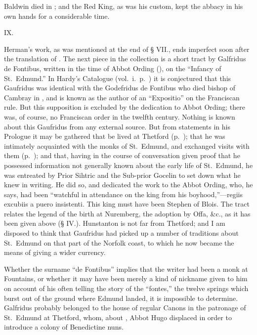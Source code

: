 \documentclass[10pt]{book}
\begin{document}
{Baldwin died in ; and the Red King, as was his custom, kept the abbacy in his own hands for a considerable time.

\vspace{.3cm}
\begin{center}
IX.
\end{center}
\noindent Herman's work, as was mentioned at the end of \S{} VII., ends imperfect soon after the translation of . The next piece in the collection is a short tract by Galfridus de Fontibus, written in the time of Abbot Ording (), on the ``Infancy of St.\ Edmund.'' In Hardy's Catalogue (vol.\ i.\ p.\ ) it is conjectured that this Gaufridus was identical with the Godefridus de Fontibus who died bishop of Cambray in , and is known as the author of an ``Expositio'' on the Franciscan rule. But this supposition is excluded by the dedication to Abbot Ording; there was, of course, no Franciscan order in the twelfth century. Nothing is known about this Gaufridus from any external source. But from statements in his Prologue it may be gathered that be lived at Thetford (p.\ ); that he was intimately acquainted with the monks of St.\ Edmund, and exchanged visits with them (p.\ ); and that, having in the course of conversation given proof that he possessed information not generally known about the early life of St.\ Edmund, he was entreated by Prior Sihtric and the Sub-prior Gocelin to set down what he knew in writing. He did so, and dedicated the work to the Abbot Ording, who, he says, had been ``watchful in attendance on the king from his boyhood,''---regiis excubiis a puero insistenti. This king must have been Stephen of Blois. The tract relates the legend of the birth at Nuremberg, the adoption by Offa, \&{}c., as it has been given above (\S{} IV.). Hunstanton is not far from Thetford; and I am disposed to think that Gaufridus had picked up a number of traditions about St.\ Edmund on that part of the Norfolk coast, to which he now became the means of giving a wider currency.

Whether the surname ``de Fontibus'' implies that the writer had been a monk at Fountains, or whether it may have been merely a kind of nickname given to him on account of his often telling the story of the ``fontes,'' the twelve springs which burst out of the ground where Edmund landed, it is impossible to determine. Galfridus probably belonged to the house of regular Canons in the patronage of St.\ Edmund at Thetford, whom, about , Abbot Hugo displaced in order to introduce a colony of Benedictine nuns.

}
\end{document}
